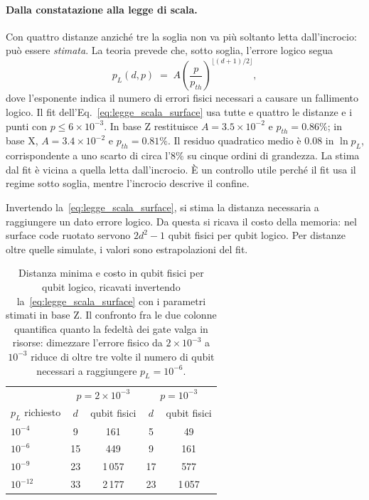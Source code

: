 \begin{onehalfspace}
\paragraph{Dalla constatazione alla legge di scala.}
Con quattro distanze anziché tre la soglia non va più soltanto letta dall'incrocio: può essere \emph{stimata}. La teoria prevede che, sotto soglia, l'errore logico segua
\begin{equation}
    p_L(d, p) \;=\; A \left(\frac{p}{p_{th}}\right)^{\lfloor (d+1)/2 \rfloor},
    \label{eq:legge_scala_surface}
\end{equation}
dove l'esponente indica il numero di errori fisici necessari a causare un fallimento logico. Il fit dell'Eq.~\eqref{eq:legge_scala_surface} usa tutte e quattro le distanze e i punti con $p \leq 6\times10^{-3}$. In base Z restituisce $A = 3.5\times10^{-2}$ e $p_{th} = 0.86\%$; in base X, $A = 3.4\times10^{-2}$ e $p_{th} = 0.81\%$. Il residuo quadratico medio è $0.08$ in $\ln p_L$, corrispondente a uno scarto di circa l'$8\%$ su cinque ordini di grandezza. La stima dal fit è vicina a quella letta dall'incrocio. È un controllo utile perché il fit usa il regime sotto soglia, mentre l'incrocio descrive il confine.

Invertendo la~\eqref{eq:legge_scala_surface}, si stima la distanza necessaria a raggiungere un dato errore logico. Da questa si ricava il costo della memoria: nel surface code ruotato servono $2d^2 - 1$ qubit fisici per qubit logico. Per distanze oltre quelle simulate, i valori sono estrapolazioni del fit.

\begin{table}[H]
\centering
\caption[Distanza e costo in qubit richiesti dalla legge di scala]{Distanza minima e costo in qubit fisici per qubit logico, ricavati invertendo la~\eqref{eq:legge_scala_surface} con i parametri stimati in base Z. Il confronto fra le due colonne quantifica quanto la fedeltà dei gate valga in risorse: dimezzare l'errore fisico da $2\times10^{-3}$ a $10^{-3}$ riduce di oltre tre volte il numero di qubit necessari a raggiungere $p_L = 10^{-6}$.}
\label{tab:distanza_richiesta}
\begin{tabular}{lcccc}
\hline
 & \multicolumn{2}{c}{$p = 2\times10^{-3}$} & \multicolumn{2}{c}{$p = 10^{-3}$} \\
$p_L$ richiesto & $d$ & qubit fisici & $d$ & qubit fisici \\
\hline
$10^{-4}$  & \phantom{0}9 & \phantom{0}161 & \phantom{0}5 & \phantom{00}49 \\
$10^{-6}$  & 15 & \phantom{0}449 & \phantom{0}9 & \phantom{0}161 \\
$10^{-9}$  & 23 & 1\,057 & 17 & \phantom{0}577 \\
$10^{-12}$ & 33 & 2\,177 & 23 & 1\,057 \\
\hline
\end{tabular}
\end{table}


\end{onehalfspace}
